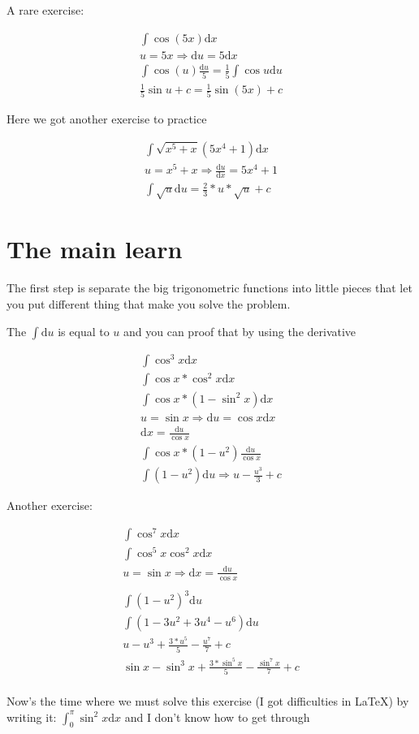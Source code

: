 \documentclass{article}
\begin{document}
\noindent A rare exercise: %

\begin{gather*}
	\int \cos (5x) \mathrm{d}x \\
	u = 5x \Rightarrow \mathrm{d}u = 5\mathrm{d}x \\
	\int \cos (u) \frac{\mathrm{d}u}{5} = \frac{1}{5} \int \cos u \mathrm{d}u \\
	\frac{1}{5}\sin u + c = \frac{1}{5}\sin (5x) + c
\end{gather*}

\par Here we got another exercise to practice

\begin{gather*}
	\int \sqrt{x^5 + x}(5x^4 + 1) \mathrm{d}x \\
	u = x^5 + x \Rightarrow \frac{\mathrm{d}u}{\mathrm{d}x} = 5x^4 + 1 \\
	\int \sqrt{u} \mathrm{d}u = \frac{2}{3}*u*\sqrt{u} + c
\end{gather*}

\section*{The main learn}

\noindent The first step is separate the big trigonometric functions into little pieces
that let you put different thing that make you solve the problem.

\noindent The $\int \mathrm{d}u$ is equal to $u$ and you can proof that by using the derivative

\begin{gather*}
	\int \cos^3 x \mathrm{d}x \\
	\int \cos x*\cos^2 x \mathrm{d}x \\
	\int \cos x*(1-\sin^2 x) \mathrm{d}x \\
	u = \sin x \Rightarrow \mathrm{d}u = \cos x \mathrm{d}x \\
	\mathrm{d}x = \frac{\mathrm{d}u}{\cos x} \\
	\int \cos x*(1-u^2)\frac{\mathrm{d}u}{\cos x} \\
	\int (1 - u^2)\mathrm{d}u \Rightarrow u - \frac{u^3}{3} + c
\end{gather*}

\noindent Another exercise:

\begin{gather*}
	\int \cos^7 x \mathrm{d}x \\
	\int \cos^5 x \cos^2 x \mathrm{d}x \\
	u = \sin x \Rightarrow \mathrm{d}x = \frac{\mathrm{d}u}{\cos x} \\ \\
	\int (1 - u^2)^3 \mathrm{d}u \\
	\int (1 - 3u^2 + 3u^4 - u^6) \mathrm{d}u \\
	u - u^3 + \frac{3 * u^5}{5} - \frac{u^7}{7} + c \\
	\sin x - \sin^3 x + \frac{3*\sin^5 x}{5} - \frac{\sin^7 x}{7} + c \\
\end{gather*}

\noindent Now's the time where we must solve this exercise (I got difficulties in \LaTeX) by
writing it: $ \int_0^\pi \sin^2 x \mathrm{d}x $ and I don't know how to get through
\end{document}
